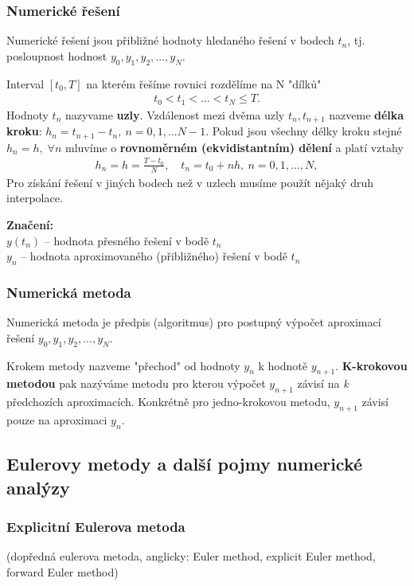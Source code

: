 \documentclass[a4]{report}
\theoremstyle{definition}
\begin{document}
{\subsubsection*{Numerické řešení}
Numerické řešení jsou přibližné hodnoty hledaného řešení v bodech $t_{n}$, tj. posloupnost hodnost  $y_{0}, y_{1}, y_{2},...,y_{N}$. 

Interval $[t_{0}, T]$ na  kterém řešíme rovnici rozdělíme na N "dílků"
\begin{align}
t_{0} <  t_{1}< ... < t_{N} \leq T. 
\end{align} 
Hodnoty $t_{n}$ nazyvame \textbf{uzly}. 
Vzdálenost mezi dvěma uzly $t_{n}, t_{n+1}$ nazveme \textbf{délka kroku}: $h_{n}=t_{n+1}-t_{n}, \: n=0,1,...N-1$. Pokud jsou všechny délky kroku stejné $h_{n}=h,\; \forall n$ mluvíme o \textbf{rovnoměrném (ekvidistantním) dělení} a  platí vztahy
\begin{align}
h_{n}=h= \frac{T-t_{0}}{N}, \quad t_{n}=t_{0}+nh, \: n =0,1,...,N,
\end{align}
Pro získání řešení v jiných bodech než v uzlech musíme použít nějaký druh interpolace. 

\textbf{Značení:} \\
$y(t_{n})$ -- hodnota přesného řešení v bodě $t_{n}$ \\
$y_{n}$ -- hodnota aproximovaného (přibližného) řešení v bodě $t_{n}$

\subsubsection*{Numerická metoda}
Numerická metoda je předpis (algoritmus) pro postupný výpočet aproximací řešení   $y_{0}, y_{1}, y_{2},...,y_{N}$.

Krokem metody nazveme "přechod" od hodnoty $y_{n}$ k hodnotě $y_{n+1}$. \textbf{K-krokovou metodou} pak nazýváme metodu pro kterou výpočet $y_{n+1}$ závisí na \textit{k} předchozích aproximacích. Konkrétně pro jedno-krokovou metodu, $y_{n+1}$ závisí pouze na aproximaci $y_{n}$.

\subsection{Eulerovy metody a další pojmy numerické analýzy}
\subsubsection*{Explicitní Eulerova metoda}
  (dopředná eulerova metoda, anglicky: Euler method, explicit Euler method, forward Euler method)

}
\end{document}
